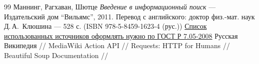 \begin{thebibliography}{99}
Маннинг, Рагхаван, Шютце
{\itshape Введение в информационный поиск} --- Издательский дом \enquote{Вильямс}, 2011. Перевод с английского: доктор физ.-мат. наук Д.\,А.\, Клюшина --- 528 с. (ISBN 978-5-8459-1623-4 (рус.))
\href{http://www.ifap.ru/library/gost/7052008.pdf}{Список использованных источников оформлять нужно по  ГОСТ Р 7.05-2008}
Русская Википедия // 
MediaWiki Action API // 
Requests: HTTP for Humans // 
Beautiful Soup Documentation // 
\end{thebibliography}
